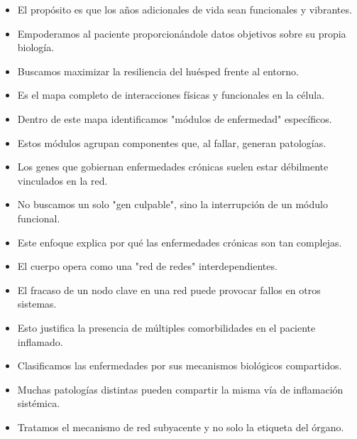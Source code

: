         \begin{itemize}
            \item El propósito es que los años adicionales de vida sean funcionales y vibrantes.
            \item Empoderamos al paciente proporcionándole datos objetivos sobre su propia biología.
            \item Buscamos maximizar la resiliencia del huésped frente al entorno.
        \end{itemize}

        \begin{itemize}
            \item Es el mapa completo de interacciones físicas y funcionales en la célula.
            \item Dentro de este mapa identificamos "módulos de enfermedad" específicos.
            \item Estos módulos agrupan componentes que, al fallar, generan patologías.
        \end{itemize}

        \begin{itemize}
            \item Los genes que gobiernan enfermedades crónicas suelen estar débilmente vinculados en la red.
            \item No buscamos un solo "gen culpable", sino la interrupción de un módulo funcional.
            \item Este enfoque explica por qué las enfermedades crónicas son tan complejas.
        \end{itemize}

        \begin{itemize}
            \item El cuerpo opera como una "red de redes" interdependientes.
            \item El fracaso de un nodo clave en una red puede provocar fallos en otros sistemas.
            \item Esto justifica la presencia de múltiples comorbilidades en el paciente inflamado.
        \end{itemize}

        \begin{itemize}
            \item Clasificamos las enfermedades por sus mecanismos biológicos compartidos.
            \item Muchas patologías distintas pueden compartir la misma vía de inflamación sistémica.
            \item Tratamos el mecanismo de red subyacente y no solo la etiqueta del órgano.
        \end{itemize}

